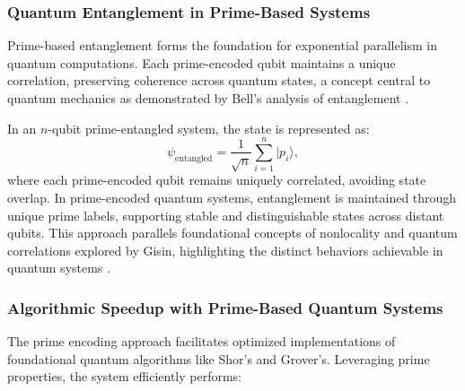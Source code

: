 \documentclass{article}
\theoremstyle{plain}
\newcommand{\primeQubit}[1]{|p_{#1}\rangle}
\begin{document}
\subsubsection{Quantum Entanglement in Prime-Based Systems}
Prime-based entanglement forms the foundation for exponential parallelism in quantum computations. Each prime-encoded qubit maintains a unique correlation, preserving coherence across quantum states, a concept central to quantum mechanics as demonstrated by Bell's analysis of entanglement \cite{bell1964}.

In an \( n \)-qubit prime-entangled system, the state is represented as:
\begin{equation}
    \psi_{\text{entangled}} = \frac{1}{\sqrt{n}} \sum_{i=1}^{n} \primeQubit{i},
\end{equation}
where each prime-encoded qubit remains uniquely correlated, avoiding state overlap. In prime-encoded quantum systems, entanglement is maintained through unique prime labels, supporting stable and distinguishable states across distant qubits. This approach parallels foundational concepts of nonlocality and quantum correlations explored by Gisin, highlighting the distinct behaviors achievable in quantum systems \cite{gisin2014}.

\subsubsection{Algorithmic Speedup with Prime-Based Quantum Systems}

The prime encoding approach facilitates optimized implementations of foundational quantum algorithms like Shor’s and Grover’s. Leveraging prime properties, the system efficiently performs:
\end{document}
